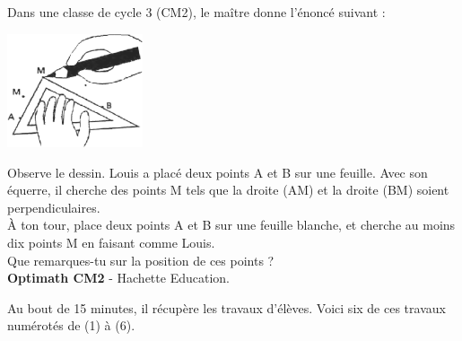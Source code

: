 \begin{exercice}
Dans une classe de cycle 3 (CM2), le maître donne l'énoncé suivant : \\
\begin{center}
\begin{minipage}{5cm}
   \includegraphics[width=4cm]{Geometrie_did/Images/Geo5_analyse_cercle_enonce}
\end{minipage}
\begin{minipage}{10cm}
   Observe le dessin. Louis a placé deux points A et B sur une feuille. Avec son équerre, il cherche des points M tels que la droite (AM) et la droite (BM) soient perpendiculaires. \\
   À ton tour, place deux points A et B sur une feuille blanche, et cherche au moins dix points M en faisant comme Louis. \\
   Que remarques-tu sur la position de ces points ? \\
   {\bf Optimath CM2} - Hachette Education.
\end{minipage}
\end{center}
Au bout de 15 minutes, il récupère les travaux d'élèves. Voici  six de ces travaux numérotés de (1) à (6). \\


\end{exercice}
